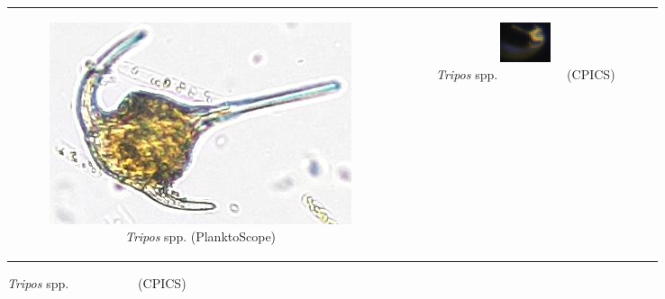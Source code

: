 \begin{figure}[t]
    \centering
    \begin{tabular}{cc}
        \begin{subfigure}[b]{0.49\linewidth}
            \centering
            \includegraphics[width=\linewidth]{latex/figures/00_26_15_300342_10.jpg}
            \caption{\textit{Tripos} spp. (PlanktoScope)}
            \label{fig:tripos-ps}
        \end{subfigure} &
        \begin{subfigure}[b]{0.49\linewidth}
            \centering
            \includegraphics[width=\linewidth]{latex/figures/20231003_162111.225.0.png}
            \caption{\textit{Tripos} spp.\ \ \ \ \ \ \ \ \ \ \  (CPICS)}
            \label{fig:tripos-cpics}

\end{subfigure}
\end{tabular}
\end{figure}
